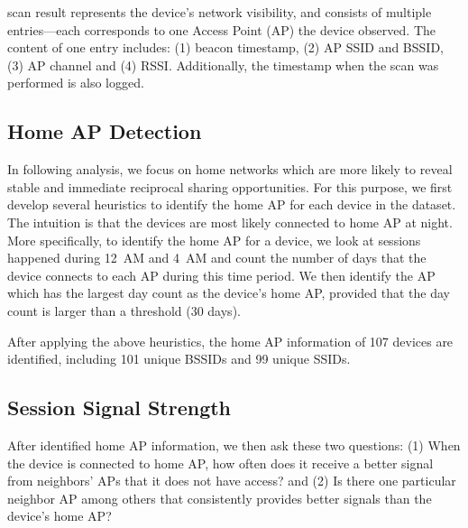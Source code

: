 \wifi{} scan result represents the device's network visibility, and consists of
multiple entries---each corresponds to one \wifi{} Access Point (AP) the device
observed. The content of one entry includes: (1) beacon timestamp, (2) AP SSID
and BSSID, (3) AP channel and (4) RSSI. Additionally, the timestamp when the
scan was performed is also logged.

\subsection{Home AP Detection}
\label{subsec:homeap}

In following analysis, we focus on home \wifi{} networks which are more likely
to reveal stable and immediate reciprocal sharing opportunities. For this
purpose, we first develop several heuristics to identify the home AP for each
device in the dataset. The intuition is that the devices are most likely
connected to home AP at night. More specifically, to identify the home AP for a
device, we look at \wifi{} sessions happened during 12~AM and 4~AM and count the
number of days that the device connects to each AP during this time period. We
then identify the AP which has the largest day count as the device's home AP,
provided that the day count is larger than a threshold (30 days).

After applying the above heuristics, the home AP information of 107 devices are
identified, including 101 unique BSSIDs and 99 unique SSIDs.

\subsection{\wifi{} Session Signal Strength}
\label{subsec:better}

After identified home AP information, we then ask these two questions: (1) When
the device is connected to home AP, how often does it receive a better signal
from neighbors' APs that it does not have access? and (2) Is there one
particular neighbor AP among others that consistently provides better signals
than the device's home AP?

